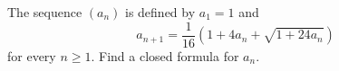 The sequence $(a_n)$ is defined by $a_1 = 1$ and
\[
a_{n+1} = \frac{1}{16}\left(1 + 4a_n + \sqrt{1 + 24a_n}\right)
\]
for every $n \geq 1$. Find a closed formula for $a_n$.
